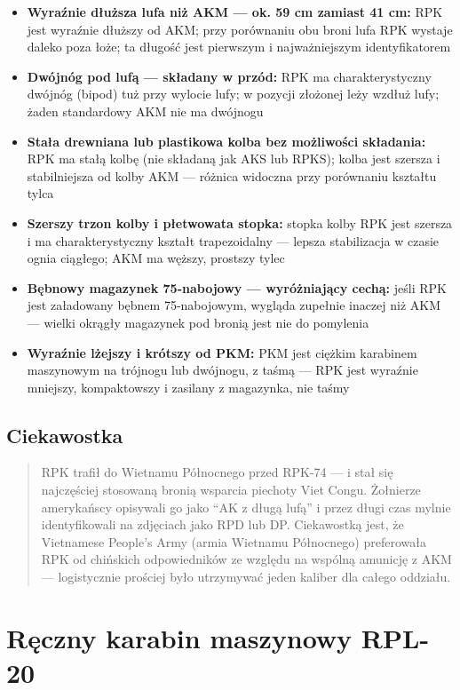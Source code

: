 \documentclass[12pt,oneside]{book}
\providecommand{\tightlist}{%
  \setlength{\itemsep}{0pt}\setlength{\parskip}{0pt}}
\begin{document}
\begin{itemize}
\tightlist
\item
  \textbf{Wyraźnie dłuższa lufa niż AKM --- ok. 59 cm zamiast 41 cm:}
  RPK jest wyraźnie dłuższy od AKM; przy porównaniu obu broni lufa RPK
  wystaje daleko poza łoże; ta długość jest pierwszym i najważniejszym
  identyfikatorem
\item
  \textbf{Dwójnóg pod lufą --- składany w przód:} RPK ma
  charakterystyczny dwójnóg (bipod) tuż przy wylocie lufy; w pozycji
  złożonej leży wzdłuż lufy; żaden standardowy AKM nie ma dwójnogu
\item
  \textbf{Stała drewniana lub plastikowa kolba bez możliwości
  składania:} RPK ma stałą kolbę (nie składaną jak AKS lub RPKS); kolba
  jest szersza i stabilniejsza od kolby AKM --- różnica widoczna przy
  porównaniu kształtu tylca
\item
  \textbf{Szerszy trzon kolby i płetwowata stopka:} stopka kolby RPK
  jest szersza i ma charakterystyczny kształt trapezoidalny --- lepsza
  stabilizacja w czasie ognia ciągłego; AKM ma węższy, prostszy tylec
\item
  \textbf{Bębnowy magazynek 75-nabojowy --- wyróżniający cechą:} jeśli
  RPK jest załadowany bębnem 75-nabojowym, wygląda zupełnie inaczej niż
  AKM --- wielki okrągły magazynek pod bronią jest nie do pomylenia
\item
  \textbf{Wyraźnie lżejszy i krótszy od PKM:} PKM jest ciężkim karabinem
  maszynowym na trójnogu lub dwójnogu, z taśmą --- RPK jest wyraźnie
  mniejszy, kompaktowszy i zasilany z magazynka, nie taśmy
\end{itemize}

\subsection{Ciekawostka}\label{ciekawostka-69}

\begin{quote}
RPK trafił do Wietnamu Północnego przed RPK-74 --- i stał się
najczęściej stosowaną bronią wsparcia piechoty Viet Congu. Żołnierze
amerykańscy opisywali go jako ``AK z długą lufą'' i przez długi czas
mylnie identyfikowali na zdjęciach jako RPD lub DP. Ciekawostką jest, że
Vietnamese People's Army (armia Wietnamu Północnego) preferowała RPK od
chińskich odpowiedników ze względu na wspólną amunicję z AKM ---
logistycznie prościej było utrzymywać jeden kaliber dla całego oddziału.
\end{quote}

\section{Ręczny karabin maszynowy
RPL-20}\label{rux119czny-karabin-maszynowy-rpl-20}
\end{document}
